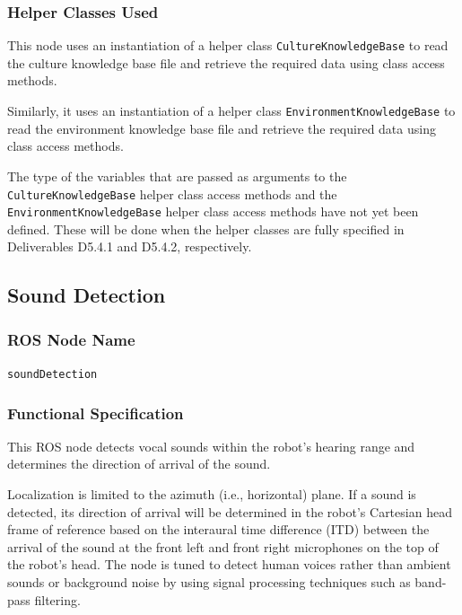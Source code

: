 \documentclass{CSSRforAfrica}
\begin{document}
{{\subsubsection*{Helper Classes Used}
This node  uses an instantiation of a helper class {\small \verb+CultureKnowledgeBase+}  to read the culture knowledge base file and retrieve the required data using  class access methods. 

Similarly, it uses  an instantiation of a helper class {\small \verb+EnvironmentKnowledgeBase+}  to read the environment knowledge base file and retrieve the required data using  class access methods.  


The type of the variables that are passed as  arguments to the 
{\small \verb+CultureKnowledgeBase+} helper class access methods and the 
{\small \verb+EnvironmentKnowledgeBase+} helper class access methods 
have not yet been defined. 
These will be done when the helper classes are fully specified in Deliverables D5.4.1 and D5.4.2, respectively.






\newpage

\subsection{Sound Detection }

\subsubsection*{ROS Node Name}
 {\small \verb+soundDetection+}   

\subsubsection*{Functional Specification}
This ROS node detects vocal sounds within the robot's hearing range and determines the direction of arrival of the sound.

Localization is limited to the azimuth (i.e., horizontal) plane.  If a sound is detected, its direction of arrival will be determined in the robot's Cartesian head frame of reference based on the interaural time difference (ITD) between the arrival of the sound at the front left and front right  microphones on the top of the robot's head.  The node is tuned to detect human voices rather than ambient sounds or background noise  by using signal processing techniques such as band-pass filtering.

}}
\end{document}
